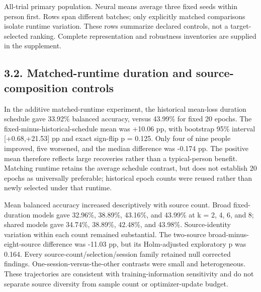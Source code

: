 \documentclass[11pt]{article}
\begin{document}
\noindent\footnotesize All-trial primary population. Neural means average three fixed seeds within person first. Rows span different batches; only explicitly matched comparisons isolate runtime variation. These rows summarize declared controls, not a target-selected ranking. Complete representation and robustness inventories are supplied in the supplement.
\par\endgroup\medskip
\subsection*{3.2. Matched-runtime duration and source-composition controls}
In the additive matched-runtime experiment, the historical mean-loss duration schedule gave 33.92\% balanced accuracy, versus 43.99\% for fixed 20 epochs. The fixed-minus-historical-schedule mean was +10.06 pp, with bootstrap 95\% interval [+0.68,+21.53] pp and exact sign-flip p = 0.125. Only four of nine people improved, five worsened, and the median difference was -0.174 pp. The positive mean therefore reflects large recoveries rather than a typical-person benefit. Matching runtime retains the average schedule contrast, but does not establish 20 epochs as universally preferable; historical epoch counts were reused rather than newly selected under that runtime.

Mean balanced accuracy increased descriptively with source count. Broad fixed-duration models gave 32.96\%, 38.89\%, 43.16\%, and 43.99\% at k = 2, 4, 6, and 8; shared models gave 34.74\%, 38.89\%, 42.48\%, and 43.98\%. Source-identity variation within each count remained substantial. The two-source broad-minus-eight-source difference was -11.03 pp, but its Holm-adjusted exploratory p was 0.164. Every source-count/selection/session family retained null corrected findings. One-session-versus-the-other contrasts were small and heterogeneous. These trajectories are consistent with training-information sensitivity and do not separate source diversity from sample count or optimizer-update budget.
\end{document}
